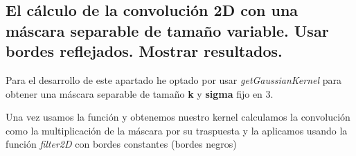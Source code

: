 \documentclass{article}
\begin{document}

\subsection{El cálculo de la convolución 2D con una máscara separable de tamaño variable. Usar bordes reflejados. Mostrar resultados.}

Para el desarrollo de este apartado he optado por usar \textit{getGaussianKernel} para obtener una máscara separable de tamaño \textbf{k} y \textbf{sigma} fijo en 3.

Una vez usamos la función y obtenemos nuestro kernel calculamos la convolución como la multiplicación de la máscara por su traspuesta y la aplicamos usando la función \textit{filter2D} con bordes constantes (bordes negros)
\end{document}
